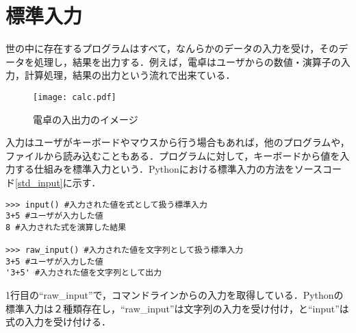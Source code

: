 \section{標準入力}
世の中に存在するプログラムはすべて，なんらかのデータの入力を受け，そのデータを処理し，結果を出力する．例えば，電卓はユーザからの数値・演算子の入力，計算処理，結果の出力という流れで出来ている．


\begin{figure}[htbp]
\begin{center}
\texttt{[image: calc.pdf]}
\caption{電卓の入出力のイメージ}
\label{fig:fig2}
\end{center}
\end{figure}


入力はユーザがキーボードやマウスから行う場合もあれば，他のプログラムや，ファイルから読み込むこともある．プログラムに対して，キーボードから値を入力する仕組みを標準入力という．Pythonにおける標準入力の方法をソースコード\ref{std_input}に示す．


\begin{lstlisting}[caption=標準入力,label=std_input]
>>> input() #入力された値を式として扱う標準入力
3+5 #ユーザが入力した値
8 #入力された式を演算した結果

>>> raw_input() #入力された値を文字列として扱う標準入力
3+5 #ユーザが入力した値
'3+5' #入力された値を文字列として出力
\end{lstlisting}


1行目の``raw\_input''で，コマンドラインからの入力を取得している．Pythonの標準入力は２種類存在し，``raw\_input''は文字列の入力を受け付け，と``input''は式の入力を受け付ける．
